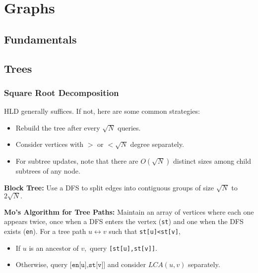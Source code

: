 \chapter{Graphs}

\section{Fundamentals}

\section{Trees}

	\subsection{Square Root Decomposition}

		HLD generally suffices. If not, here are some common strategies:
		
		\begin{itemize}
			\item Rebuild the tree after every $\sqrt N$ queries. %
			\item Consider vertices with $>$ or $<\sqrt N$ degree separately. %
			\item For subtree updates, note that there are $O(\sqrt N)$ distinct sizes among child subtrees of any node.
		\end{itemize}

		\textbf{Block Tree:} Use a DFS to split edges into contiguous groups of size $\sqrt N$ to $2\sqrt N.$

		\textbf{Mo's Algorithm for Tree Paths:} Maintain an array of vertices where each one appears twice, once when a DFS enters the vertex (\texttt{st}) and one when the DFS exists (\texttt{en}). For a tree path $u\leftrightarrow v$ such that \texttt{st[u]<st[v]},

		\begin{itemize}
		\item If $u$ is an ancestor of $v,$ query \texttt{[st[u],st[v]]}.
		\item Otherwise, query $\texttt{[en[u],st[v]]}$ and consider $LCA(u,v)$ separately.
		\end{itemize}

